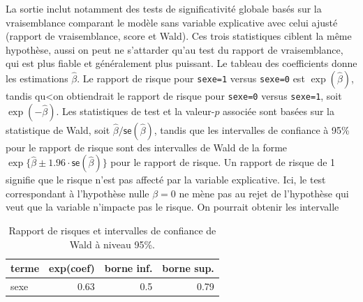 \documentclass[
  11pt,
  letterpaper,
]{book}
\theoremstyle{definition}
\theoremstyle{remark}
\begin{document}
La sortie inclut notamment des tests de significativité globale basés
sur la vraisemblance comparant le modèle sans variable explicative avec
celui ajusté (rapport de vraisemblance, score et Wald). Ces trois
statistiques ciblent la même hypothèse, aussi on peut ne s'attarder
qu'au test du rapport de vraisemblance, qui est plus fiable et
généralement plus puissant. Le tableau des coefficients donne les
estimations \(\widehat{\beta}\). Le rapport de risque pour
\texttt{sexe=1} versus \texttt{sexe=0} est \(\exp(\widehat{\beta})\),
tandis qu\textless on obtiendrait le rapport de risque pour
\texttt{sexe=0} versus \texttt{sexe=1}, soit \(\exp(-\widehat{\beta})\).
Les statistiques de test et la valeur-\(p\) associée sont basées sur la
statistique de Wald, soit
\(\widehat{\beta}/\mathsf{se}(\widehat{\beta})\), tandis que les
intervalles de confiance à 95\% pour le rapport de risque sont des
intervalles de Wald de la forme
\(\exp\{\widehat{\beta} \pm 1.96 \cdot \mathsf{se}(\widehat{\beta})\}\)
pour le rapport de risque. Un rapport de risque de 1 signifie que le
risque n'est pas affecté par la variable explicative. Ici, le test
correspondant à l'hypothèse nulle \(\beta=0\) ne mène pas au rejet de
l'hypothèse qui veut que la variable n'impacte pas le risque. On
pourrait obtenir les intervalle

\hypertarget{tbl-cox1}{}
\begin{table}
\caption{\label{tbl-cox1}Rapport de risques et intervalles de confiance de Wald à niveau 95\%. }\tabularnewline

\centering
\begin{tabular}{lrrr}
\toprule
terme & exp(coef) & borne inf. & borne sup.\\
\midrule
sexe & 0.63 & 0.5 & 0.79\\
\bottomrule
\end{tabular}
\end{table}
\end{document}

